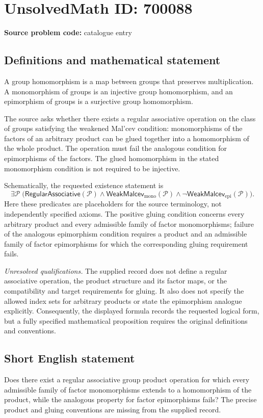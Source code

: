 \documentclass[11pt]{article}
\begin{document}
\section*{UnsolvedMath ID: 700088}
\textbf{Source problem code:} catalogue entry
\subsection{Definitions and mathematical statement}
A group homomorphism is a map between groups that preserves multiplication. A monomorphism of groups is an injective group homomorphism, and an epimorphism of groups is a surjective group homomorphism.

The source asks whether there exists a regular associative operation on the class of groups satisfying the weakened Mal'cev condition: monomorphisms of the factors of an arbitrary product can be glued together into a homomorphism of the whole product. The operation must fail the analogous condition for epimorphisms of the factors. The glued homomorphism in the stated monomorphism condition is not required to be injective.

Schematically, the requested existence statement is
\[
\exists\mathcal P\;\bigl(
\mathsf{RegularAssociative}(\mathcal P)
\land \mathsf{WeakMalcev}_{\mathrm{mono}}(\mathcal P)
\land \neg\mathsf{WeakMalcev}_{\mathrm{epi}}(\mathcal P)
\bigr).
\]
Here these predicates are placeholders for the source terminology, not independently specified axioms. The positive gluing condition concerns every arbitrary product and every admissible family of factor monomorphisms; failure of the analogous epimorphism condition requires a product and an admissible family of factor epimorphisms for which the corresponding gluing requirement fails.

\emph{Unresolved qualifications.} The supplied record does not define a regular associative operation, the product structure and its factor maps, or the compatibility and target requirements for gluing. It also does not specify the allowed index sets for arbitrary products or state the epimorphism analogue explicitly. Consequently, the displayed formula records the requested logical form, but a fully specified mathematical proposition requires the original definitions and conventions.
\subsection{Short English statement}
Does there exist a regular associative group product operation for which every admissible family of factor monomorphisms extends to a homomorphism of the product, while the analogous property for factor epimorphisms fails? The precise product and gluing conventions are missing from the supplied record.
\end{document}
